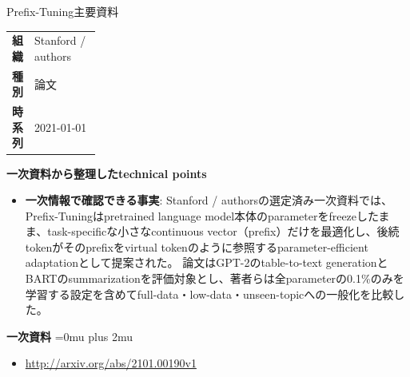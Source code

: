 \begin{technicalnote}{Prefix-Tuning}{主要資料}
\begingroup
\begin{tabularx}{\linewidth}{@{}>{\bfseries}p{0.22\linewidth}X@{}}
組織 & Stanford / authors \\
種別 & 論文 \\
時系列 & 2021-01-01 \\
\end{tabularx}
\smallskip
{\bfseries 一次資料から整理したtechnical points}
\begin{itemize}[leftmargin=1.5em,itemsep=0.35em]
\item \textbf{一次情報で確認できる事実}: Stanford / authorsの選定済み一次資料では、Prefix-Tuningはpretrained language model本体のparameterをfreezeしたまま、task-specificな小さなcontinuous vector（prefix）だけを最適化し、後続tokenがそのprefixをvirtual tokenのように参照するparameter-efficient adaptationとして提案された。 論文はGPT-2のtable-to-text generationとBARTのsummarizationを評価対象とし、著者らは全parameterの0.1\%のみを学習する設定を含めてfull-data・low-data・unseen-topicへの一般化を比較した。
\end{itemize}
\begin{minipage}{\linewidth}
\begin{samepage}
{\bfseries 一次資料}
\begingroup\sloppy
\Urlmuskip=0mu plus 2mu\relax
\begin{itemize}[leftmargin=1.5em,itemsep=0.25em]
\item {\scriptsize\url{http://arxiv.org/abs/2101.00190v1}}
\end{itemize}
\endgroup
\end{samepage}
\end{minipage}
\endgroup
\end{technicalnote}
\medskip

